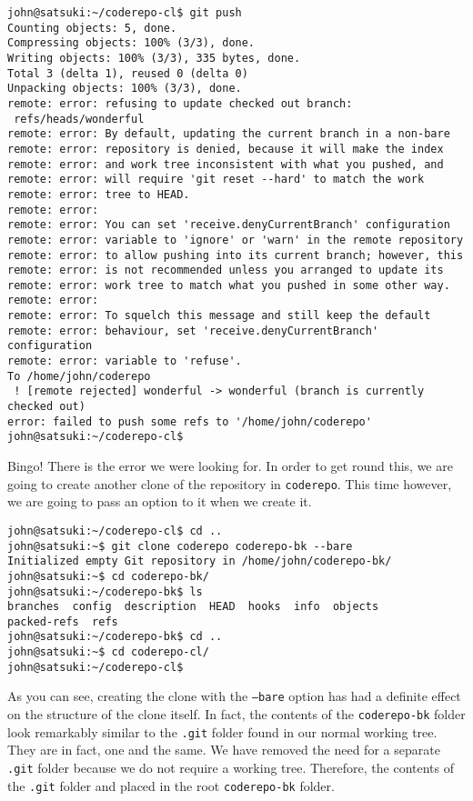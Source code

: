 \begin{Verbatim}[frame=leftline,framerule=1mm,fontsize=\relsize{-3}] 
john@satsuki:~/coderepo-cl$ git push
Counting objects: 5, done.
Compressing objects: 100% (3/3), done.
Writing objects: 100% (3/3), 335 bytes, done.
Total 3 (delta 1), reused 0 (delta 0)
Unpacking objects: 100% (3/3), done.
remote: error: refusing to update checked out branch: 
 refs/heads/wonderful
remote: error: By default, updating the current branch in a non-bare 
remote: error: repository is denied, because it will make the index 
remote: error: and work tree inconsistent with what you pushed, and 
remote: error: will require 'git reset --hard' to match the work 
remote: error: tree to HEAD.
remote: error: 
remote: error: You can set 'receive.denyCurrentBranch' configuration 
remote: error: variable to 'ignore' or 'warn' in the remote repository 
remote: error: to allow pushing into its current branch; however, this 
remote: error: is not recommended unless you arranged to update its 
remote: error: work tree to match what you pushed in some other way.
remote: error: 
remote: error: To squelch this message and still keep the default 
remote: error: behaviour, set 'receive.denyCurrentBranch' configuration 
remote: error: variable to 'refuse'.
To /home/john/coderepo
 ! [remote rejected] wonderful -> wonderful (branch is currently checked out)
error: failed to push some refs to '/home/john/coderepo'
john@satsuki:~/coderepo-cl$ 
\end{Verbatim}

Bingo!  There is the error we were looking for.  In order to get round this, we are going to create another clone of the repository in \texttt{coderepo}.  This time however, we are going to pass an option to it when we create it.

\begin{Verbatim}[frame=leftline,framerule=1mm,fontsize=\relsize{-3}] 
john@satsuki:~/coderepo-cl$ cd ..
john@satsuki:~$ git clone coderepo coderepo-bk --bare
Initialized empty Git repository in /home/john/coderepo-bk/
john@satsuki:~$ cd coderepo-bk/
john@satsuki:~/coderepo-bk$ ls
branches  config  description  HEAD  hooks  info  objects  
packed-refs  refs
john@satsuki:~/coderepo-bk$ cd ..
john@satsuki:~$ cd coderepo-cl/
john@satsuki:~/coderepo-cl$ 
\end{Verbatim}

As you can see, creating the clone with the \texttt{--bare} option has had a definite effect on the structure of the clone itself.  In fact, the contents of the \texttt{coderepo-bk} folder look remarkably similar to the \texttt{.git} folder found in our normal working tree.  They are in fact, one and the same.  We have removed the need for a separate \texttt{.git} folder because we do not require a working tree.  Therefore, the contents of the \texttt{.git} folder and placed in the root \texttt{coderepo-bk} folder.

